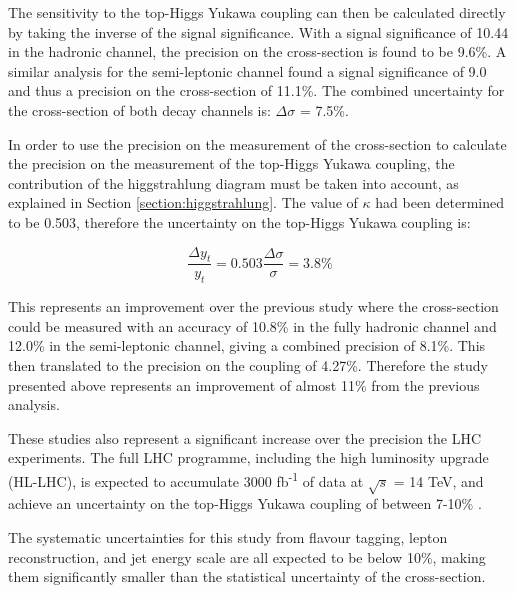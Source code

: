 The sensitivity to the top-Higgs Yukawa coupling can then be calculated directly by taking the inverse of the signal significance. With a signal significance of 10.44 in the hadronic channel, the precision on the cross-section is found to be 9.6\%. A similar analysis for the semi-leptonic channel found a signal significance of 9.0 and thus a precision on the cross-section of 11.1\%. The combined uncertainty for the cross-section of both decay channels is: $\Delta\sigma$ = 7.5\%.

In order to use the precision on the measurement of the cross-section to calculate the precision on the measurement of the top-Higgs Yukawa coupling, the contribution of the higgstrahlung diagram must be taken into account, as explained in Section \ref{section:higgstrahlung}. The value of $\kappa$ had been determined to be 0.503, therefore the uncertainty on the top-Higgs Yukawa coupling is:

\begin{equation}
	\frac{\Delta y_t}{y_t} = 0.503 \frac{\Delta\sigma}{\sigma} = 3.8\%
\label{eq:result-coupling}
\end{equation}

This represents an improvement over the previous study \cite{clic-yukawa-coupling-2014} where the cross-section could be measured with an accuracy of 10.8\% in the fully hadronic channel and 12.0\% in the semi-leptonic channel, giving a combined precision of 8.1\%. This then translated to the precision on the coupling of 4.27\%. Therefore the study presented above represents an improvement of almost 11\% from the previous analysis.

These studies also represent a significant increase over the precision the \acrshort{LHC} experiments. The full \acrshort{LHC} programme, including the high luminosity upgrade (\acrshort{HL-LHC}), is expected to accumulate 3000 fb\textsuperscript{-1} of data at $\sqrt{s}$ = 14 TeV, and achieve an uncertainty on the top-Higgs Yukawa coupling of between 7-10\% \cite{lhc-top-yukawa}.

The systematic uncertainties for this study from flavour tagging, lepton reconstruction, and jet energy scale are all expected to be below 10\%, making them significantly smaller than the statistical uncertainty of the cross-section. \\


